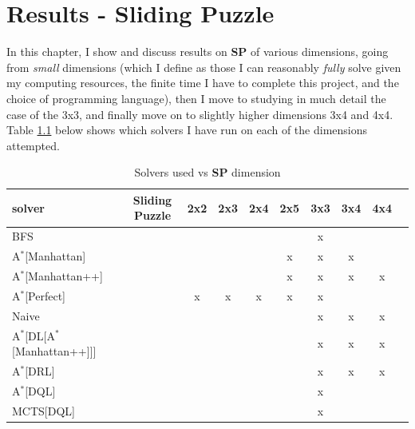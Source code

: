 
\chapter{Results - Sliding Puzzle} %

\label{sec:ResultsSP} %


In this chapter, I show and discuss results on \textbf{SP} of various dimensions, going from \textit{small} dimensions (which I define as those I can reasonably \textit{fully} solve given my computing resources, the finite time I have to complete this project, and the choice of programming language), then I move to studying in much detail the case of the 3x3, and finally move on to slightly higher dimensions 3x4 and 4x4. Table \ref{tab:gridSP} below shows which solvers I have run on each of the dimensions attempted.

\begin{table}[H]
\begin{center}
\begin{tabular}{l*{9}{c}r}
\hline
\textbf{solver}      & & \textbf{Sliding Puzzle} & \textbf{2x2} & \textbf{2x3} & \textbf{2x4} & \textbf{2x5}  & \textbf{3x3} & \textbf{3x4} & \textbf{4x4} \\ 
\hline
BFS   & & & & & & &  x  & & \\
\hline
A$^{*}$[Manhattan]   & & & & & &  x  &  x  &  x  & \\
\hline
A$^{*}$[Manhattan++]   & & & & & &  x  &  x  &  x  & x \\
\hline
A$^{*}$[Perfect]   & & &  x  &  x  &  x  &  x  &  x  & & \\
\hline
Naive   & & & & & & &  x  &  x  & x \\
\hline
A$^{*}$[DL[A$^{*}$[Manhattan++]]]   & & & & & & &  x  &  x  & x \\
\hline
A$^{*}$[DRL]   & & & & & & &  x  &  x  & x \\
\hline
A$^{*}$[DQL]   & & & & & & &  x  & & \\
\hline
MCTS[DQL]        & & & & & & &  x  & & \\
\end{tabular}
\caption{\label{tab:gridSP} Solvers used vs \textbf{SP} dimension}
\end{center}
\end{table}

